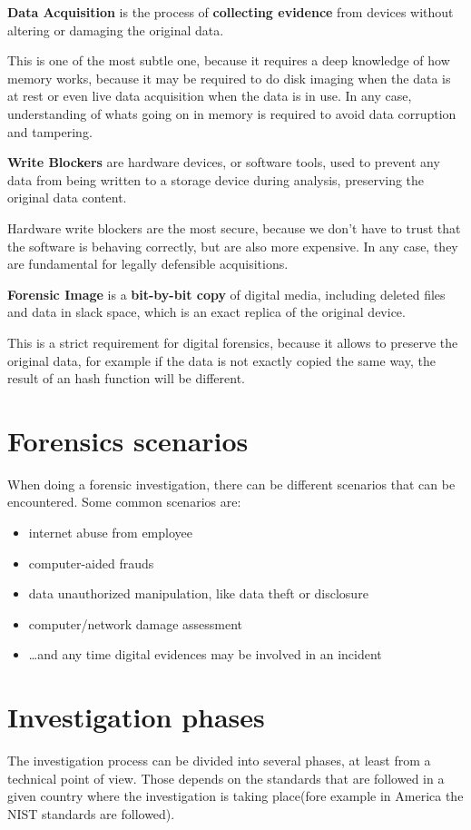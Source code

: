 \begin{boxH}
  \textbf{Data Acquisition} is the process of \textbf{collecting
  evidence} from devices without altering or damaging the original
  data.
\end{boxH}
This is one of the most subtle one, because it requires a deep
knowledge of how memory works, because it may be required to do disk
imaging when the data is at rest or even live data acquisition when
the data is in use. In any case, understanding of whats going on in
memory is required to avoid data corruption and tampering.

\begin{boxH}
  \textbf{Write Blockers} are hardware devices, or software tools,
  used to prevent any data from being written to a storage device
  during analysis, preserving the original data content.
\end{boxH}
Hardware write blockers are the most secure, because we don't have to
trust that the software is behaving correctly, but are also more 
expensive. In any case, they are fundamental for legally defensible
acquisitions.
\begin{boxH}
  \textbf{Forensic Image} is a \textbf{bit-by-bit copy} of digital
  media, including deleted files and data in slack space, which is an
  exact replica of the original device.
\end{boxH}
This is a strict requirement for digital forensics, because it allows
to preserve the original data, for example if the data is not exactly
copied the same way, the result of an hash function will be different.

\section{Forensics scenarios}
When doing a forensic investigation, there can be different scenarios
that can be encountered. Some common scenarios are:
\begin{itemize}
  \item internet abuse from employee
  \item computer-aided frauds
  \item data unauthorized manipulation, like data theft or disclosure
  \item computer/network damage assessment
  \item …and any time digital evidences may be involved in an incident
\end{itemize}
\section{Investigation phases}
The investigation process can be divided into several phases, at least
from a technical point of view. Those depends on the standards that
are followed in a given country where the investigation is taking 
place(fore example in America the NIST standards are followed).
